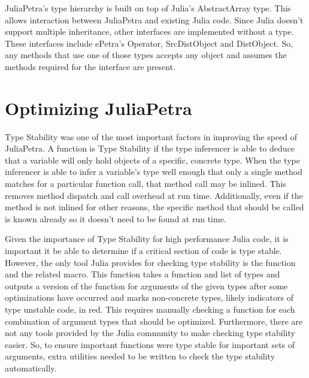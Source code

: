 \documentclass[acmsmall]{acmart}
\newcommand{\juliaSnippet}[1]{\texttt{\detokenize{#1}}}
\begin{document}
JuliaPetra's type hierarchy is built on top of Julia's AbstractArray type.  This allows
interaction between JuliaPetra and existing Julia code.
Since Julia doesn't support multiple inheritance, %
other interfaces are implemented without a type.
These interfaces include ePetra's Operator, SrcDistObject and DistObject.
So, any methods that use one of those types accepts any object and assumes
the methods required for the interface are present.

\section{Optimizing JuliaPetra}

Type Stability was one of the most important factors in improving the speed of JuliaPetra.
A function is Type Stability if the type inferencer is able to deduce that a variable will only
hold objects of a specific, concrete type.
When the type inferencer is able to infer a variable's type well enough that only a single
method matches for a particular function call, that method call may be inlined. \cite{JuliaDesignPaper}
This removes method dispatch and call overhead at run time.
Additionally, even if the method is not inlined for other reasons, the specific method that should
be called is known already so it doesn't need to be found at run time.

Given the importance of Type Stability for high performance Julia code, it is important it be able
to determine if a critical section of code is type stable.
However, the only tool Julia provides for checking type stability is the \juliaSnippet{code_warntype}
function and the related \juliaSnippet{@code_warntype} macro.  This function takes a function and list
of types and outputs a version of the function for arguments of the given types after some optimizations
have occurred and marks non-concrete types, likely indicators of type unstable code, in red.
This requires manually checking a function for each combination of argument types that should be optimized.
Furthermore, there are not any tools provided by the Julia community to make checking type stability easier.
So, to ensure important functions were type stable for important sets of arguments,
extra utilities needed to be written to check the type stability automatically.
\end{document}
